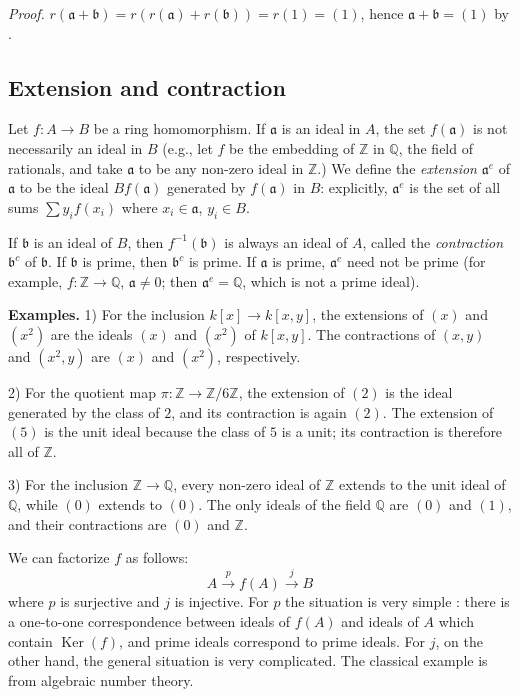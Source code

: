 \noindent\textit{Proof.} $r(\mathfrak a+\mathfrak b)=r(r(\mathfrak a)+r(\mathfrak b))=r(1)=(1)$, hence $\mathfrak a+\mathfrak b=(1)$ by .

\subsection{Extension and contraction}

Let $f:A\longrightarrow B$ be a ring homomorphism. If $\mathfrak a$ is an ideal in $A$, the set $f(\mathfrak a)$ is not necessarily an ideal in $B$ (e.g., let $f$ be the embedding of $\mathbb Z$ in $\mathbb Q$, the field of rationals, and take $\mathfrak a$ to be any non-zero ideal in $\mathbb Z$.) We define the \textit{extension} $\mathfrak a^e$ of $\mathfrak a$ to be the ideal $Bf(\mathfrak a)$ generated by $f(\mathfrak a)$ in $B$: explicitly, $\mathfrak a^e$ is the set of all sums $\sum y_i f(x_i)$ where $x_i\in\mathfrak a$, $y_i\in B$.

If $\mathfrak b$ is an ideal of $B$, then $f^{-1}(\mathfrak b)$ is always an ideal of $A$, called the \textit{contraction} $\mathfrak b^c$ of $\mathfrak b$. If $\mathfrak b$ is prime, then $\mathfrak b^c$ is prime. If $\mathfrak a$ is prime, $\mathfrak a^e$ need not be prime (for example, $f:\mathbb Z\longrightarrow\mathbb Q$, $\mathfrak a\neq0$; then $\mathfrak a^e=\mathbb Q$, which is not a prime ideal).

\textline
\noindent\textbf{Examples.} 1) For the inclusion
$k[x]\longrightarrow k[x,y]$, the extensions of $(x)$ and $(x^2)$ are the
ideals $(x)$ and $(x^2)$ of $k[x,y]$.  The contractions of $(x,y)$ and
$(x^2,y)$ are $(x)$ and $(x^2)$, respectively.

2) For the quotient map $\pi:\mathbb Z\longrightarrow\mathbb Z/6\mathbb Z$,
the extension of $(2)$ is the ideal generated by the class of $2$, and its
contraction is again $(2)$.  The extension of $(5)$ is the unit ideal because
the class of $5$ is a unit; its contraction is therefore all of $\mathbb Z$.

3) For the inclusion $\mathbb Z\longrightarrow\mathbb Q$, every non-zero ideal
of $\mathbb Z$ extends to the unit ideal of $\mathbb Q$, while $(0)$ extends to
$(0)$.  The only ideals of the field $\mathbb Q$ are $(0)$ and $(1)$, and their
contractions are $(0)$ and $\mathbb Z$.
\textline

We can factorize $f$ as follows:
\[
 A\xrightarrow{p}f(A)\xrightarrow{j}B
\]
where $p$ is surjective and $j$ is injective. For $p$ the situation is very simple : there is a one-to-one correspondence between ideals of $f(A)$ and ideals of $A$ which contain $\operatorname{Ker}(f)$, and prime ideals correspond to prime ideals. For $j$, on the other hand, the general situation is very complicated. The classical example is from algebraic number theory.

